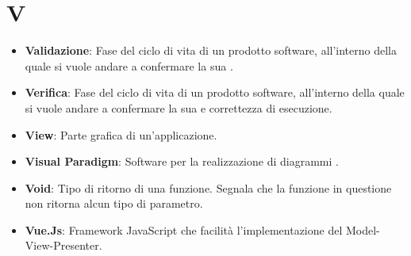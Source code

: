 \section*{V}
\begin{itemize}
	\item
	\textbf{Validazione}: Fase del ciclo di vita di un prodotto software, all'interno della quale si vuole andare a confermare la sua .
	\item
	\textbf{Verifica}: Fase del ciclo di vita di un prodotto software, all'interno della quale si vuole andare a confermare la sua  e correttezza di esecuzione.
	\item
	\textbf{View}: Parte grafica di un'applicazione.
	\item
	\textbf{Visual Paradigm}: Software per la realizzazione di diagrammi .
	\item
	\textbf{Void}: Tipo di ritorno di una funzione. Segnala che la funzione in questione non ritorna alcun tipo di parametro.
	\item
	\textbf{Vue.Js}: Framework JavaScript che facilità l'implementazione del Model-View-Presenter.
\end{itemize}
\newpage